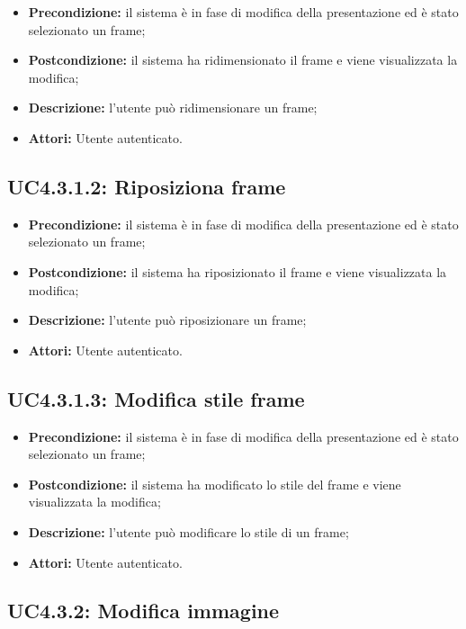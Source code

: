 \begin{itemize}
	\item \textbf{Precondizione:} il sistema è in fase di modifica della presentazione ed è stato selezionato un frame;
	\item \textbf{Postcondizione:} il sistema ha ridimensionato il frame e viene visualizzata la modifica;
	\item \textbf{Descrizione:} l'utente può ridimensionare un frame;
	\item \textbf{Attori:} Utente autenticato.
\end{itemize}
\subsection{ UC4.3.1.2: Riposiziona frame}

\begin{itemize}
	\item \textbf{Precondizione:} il sistema è in fase di modifica della presentazione ed è stato selezionato un frame;
	\item \textbf{Postcondizione:} il sistema ha riposizionato il frame e viene visualizzata la modifica;
	\item \textbf{Descrizione:} l'utente può riposizionare un frame;
	\item \textbf{Attori:} Utente autenticato.
\end{itemize}
\subsection{ UC4.3.1.3: Modifica stile frame}

\begin{itemize}
	\item \textbf{Precondizione:} il sistema è in fase di modifica della presentazione ed è stato selezionato un frame;
	\item \textbf{Postcondizione:} il sistema ha modificato lo stile del frame e viene visualizzata la modifica;
	\item \textbf{Descrizione:} l'utente può modificare lo stile di un frame;
	\item \textbf{Attori:} Utente autenticato.
\end{itemize}
\subsection{ UC4.3.2: Modifica immagine}

